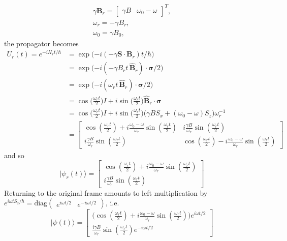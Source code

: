 \documentclass[../principles-of-quantum-mechanics.tex]{subfiles}
\begin{document}
\begin{questions}
\begin{solution}
			\begin{gather*}
				\gamma\mathbf{B}_r = \begin{bmatrix}\gamma B & \omega_0 - \omega\end{bmatrix}^T, \\
				\omega_r = {-\gamma}B_r, \\
				\omega_0 = \gamma B_0,
			\end{gather*}
			the propagator becomes
			\begin{align*}
				U_r(t) = e^{-iH_rt/\hbar} &= \exp\big({-i}(-\gamma\mathbf{S}\cdot\mathbf{B}_r)t/\hbar\big) \\
				&= \exp\big({-i}(-\gamma B_r t\,\hat{\mathbf{B}}_r)\cdot\boldsymbol{\sigma}/2\big) \\
				&= \exp\big({-i}(\omega_rt\,\hat{\mathbf{B}}_r)\cdot\boldsymbol{\sigma}/2\big) \\
				&= \cos\Big(\frac{\omega_rt}{2}\Big)I + i\sin\Big(\frac{\omega_rt}{2}\Big)\hat{\mathbf{B}}_r\cdot\boldsymbol{\sigma} \\
				&= \cos\Big(\frac{\omega_rt}{2}\Big)I + i\sin\Big(\frac{\omega_rt}{2}\Big)\big(\gamma B S_x + (\omega_0-\omega)S_z\big)\omega_r^{-1} \\
				&= \begin{bmatrix}
					\cos(\tfrac{\omega_rt}{2}) + i\tfrac{\omega_0-\omega}{\omega_r}\sin(\tfrac{\omega_rt}{2}) & i\tfrac{\gamma B}{\omega_r}\sin(\tfrac{\omega_rt}{2}) \\
					i\tfrac{\gamma B}{\omega_r}\sin(\tfrac{\omega_rt}{2}) & \cos(\tfrac{\omega_rt}{2}) - i\tfrac{\omega_0-\omega}{\omega_r}\sin(\tfrac{\omega_rt}{2})
				\end{bmatrix}
			\end{align*}
				and so
				$$|\psi_r(t)\rangle = \begin{bmatrix}
					\cos(\tfrac{\omega_rt}{2}) + i\tfrac{\omega_0-\omega}{\omega_r}\sin(\tfrac{\omega_rt}{2}) \\
					i\tfrac{\gamma B}{\omega_r}\sin(\tfrac{\omega_rt}{2})
				\end{bmatrix}$$
			Returning to the original frame amounts to left multiplication by $e^{i\omega tS_z/\hbar} = \mathrm{diag}\begin{pmatrix}e^{i\omega t/2} & e^{-i\omega t / 2}\end{pmatrix}$, i.e.
			$$|\psi(t)\rangle = \begin{bmatrix}\Big(\cos(\frac{\omega_rt}{2}) + i\frac{\omega_0 - \omega}{\omega_r}\sin(\frac{\omega_rt}{2})\Big)e^{i\omega t/2} \\ \frac{i\gamma B}{\omega_r}\sin(\frac{\omega_rt}{2})e^{-i\omega t/2}\end{bmatrix}$$

\end{solution}
\end{questions}
\end{document}
